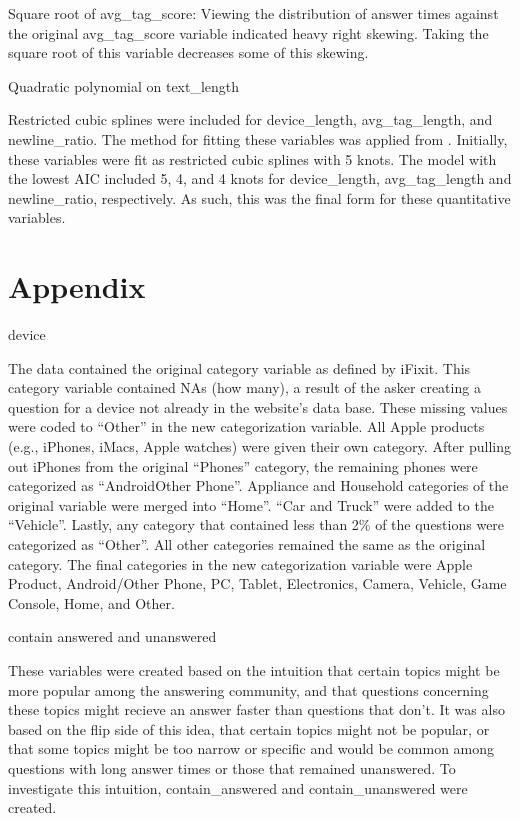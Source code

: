 \documentclass[12pt]{article}
\begin{document}
Square root of avg\_tag\_score: Viewing the distribution of answer times against the original avg\_tag\_score variable indicated heavy right skewing. Taking the square root of this variable decreases some of this skewing.

Quadratic polynomial on text_length 

Restricted cubic splines were included for device_length, avg_tag_length, and newline_ratio. The method for fitting these variables was applied from \citep{Harrell2015}. Initially, these variables were fit as restricted cubic splines with 5 knots. The model with the lowest AIC included 5, 4, and 4 knots for device_length, avg_tag_length and newline_ratio, respectively. As such, this was the final form for these quantitative variables. 





\section{Appendix} 

device

The data contained the original category variable as defined by iFixit. This category variable contained NAs (how many), a result of the asker creating a question for a device not already in the website's data base. These missing values were coded to ``Other'' in the new categorization variable. All Apple products (e.g., iPhones, iMacs, Apple watches) were given their own category. After pulling out iPhones from the original ``Phones'' category, the remaining phones were categorized as ``AndroidOther Phone''. Appliance and Household categories of the original variable were merged into ``Home''. ``Car and Truck'' were added to the ``Vehicle''. Lastly, any category that contained less than 2\% of the questions were categorized as ``Other''. All other categories remained the same as the original category. The final categories in the new categorization variable were Apple Product, Android/Other Phone, PC, Tablet, Electronics, Camera, Vehicle, Game Console, Home, and Other. 

contain answered and unanswered

  These variables were created based on the intuition that certain topics might be more popular among the answering community, and that questions concerning these topics might recieve an answer faster than questions that don't. It was also based on the flip side of this idea, that certain topics might not be popular, or that some topics might be too narrow or specific and would be common among questions with long answer times or those that remained unanswered. To investigate this intuition, contain_answered and contain_unanswered were created. 
  
\end{document}
